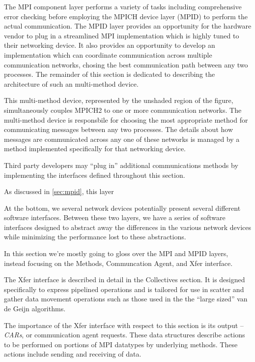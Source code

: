 \documentclass[11pt,letterpaper]{article}
\begin{document}
The MPI component layer performs a variety of tasks including
comprehensive error checking before employing the MPICH device layer
(MPID) to perform the actual communication.  The MPID layer provides
an opportunity for the hardware vendor to plug in a streamlined MPI
implementation which is highly tuned to their networking device.  It
also provides an opportunity to develop an implementation which can
coordinate communication across multiple communication networks,
chosing the best communication path between any two processes.  The
remainder of this section is dedicated to describing the architecture
of such an multi-method device.

This multi-method device, represented by the unshaded region of the
figure, simultaneously couples MPICH2 to one or more communication
networks.  The multi-method device is responsbile for choosing the
most appropriate method for communicating messages between any two
processes.  The details about how messages are communicated across any
one of these networks is managed by a method implemented specifically
for that networking device.

Third party developers may ``plug in'' additional communications
methods by implementing the interfaces defined throughout this
section.




As discussed in \ref{sec:mpid}, this layer

 At the bottom, we several network devices potentially present
several different software interfaces.  Between these two layers, we have a
series of software interfaces designed to abstract away the differences in the
various network devices while minimizing the performance lost to these
abstractions.

In this section we're mostly going to gloss over the MPI and MPID layers,
instead focusing on the Methods, Communcation Agent, and Xfer interface.

The Xfer interface is described in detail in the Collectives section.  It is
designed specifically to express pipelined operations and is tailored for use
in scatter and gather data movement operations such as those used in the the
``large sized'' van de Geijn algorithms.

The importance of the Xfer interface with respect to this section is its output
-- \emph{CARs}, or communication agent requests.  These data structures
describe actions to be performed on portions of MPI datatypes by underlying
methods.  These actions include sending and receiving of data.
\end{document}
